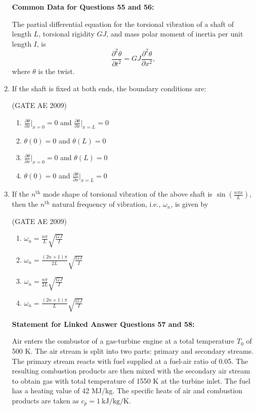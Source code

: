 \documentclass[journal,12pt,onecolumn]{IEEEtran}
\theoremstyle{remark}
\begin{document}
\begin{flushleft}
\begin{enumerate}
\begin{enumerate}
\end{enumerate}
\textbf{Common Data for Questions 55 and 56:}

The partial differential equation for the torsional vibration of a shaft of length \(L\), torsional rigidity \(GJ\), and mass polar moment of inertia per unit length \(I\), is
\[
\frac{\partial^2 \theta}{\partial t^2} = GJ \frac{\partial^2 \theta}{\partial x^2},
\]
where \(\theta\) is the twist.

\item If the shaft is fixed at both ends, the boundary conditions are:

\hfill(GATE AE 2009)

\begin{enumerate}
\item \(\frac{\partial \theta}{\partial x}\bigg|_{x=0} = 0\) and \(\frac{\partial \theta}{\partial x}\bigg|_{x=L} = 0\)
\item \(\theta(0) = 0\) and \(\theta(L) = 0\)
\item \(\frac{\partial \theta}{\partial x}\bigg|_{x=0} = 0\) and \(\theta(L) = 0\)
\item \(\theta(0) = 0\) and \(\frac{\partial \theta}{\partial x}\bigg|_{x=L} = 0\)
\end{enumerate}

\item If the \(n^{\text{th}}\) mode shape of torsional vibration of the above shaft is \(\sin\left( \frac{n \pi x}{L} \right)\), then the \(n^{\text{th}}\) natural frequency of vibration, i.e., \(\omega_n\), is given by

\hfill(GATE AE 2009)

\begin{enumerate}
\item \(\omega_n = \frac{n \pi}{L} \sqrt{\frac{GJ}{I}}\)
\item \(\omega_n = \frac{(2n+1)\pi}{2L} \sqrt{\frac{GJ}{I}}\)
\item \(\omega_n = \frac{n \pi}{2L} \sqrt{\frac{GJ}{I}}\)
\item \(\omega_n = \frac{(2n+1)\pi}{L} \sqrt{\frac{GJ}{I}}\)
\end{enumerate}

\textbf{Statement for Linked Answer Questions 57 and 58:}

Air enters the combustor of a gas-turbine engine at a total temperature \(T_0\) of 500 K. The air stream is split into two parts: primary and secondary streams. The primary stream reacts with fuel supplied at a fuel-air ratio of 0.05. The resulting combustion products are then mixed with the secondary air stream to obtain gas with total temperature of 1550 K at the turbine inlet. The fuel has a heating value of 42 MJ/kg. The specific heats of air and combustion products are taken as \(c_p = 1\ \mathrm{kJ/kg/K}\).


\end{enumerate}
\end{flushleft}
\end{document}
